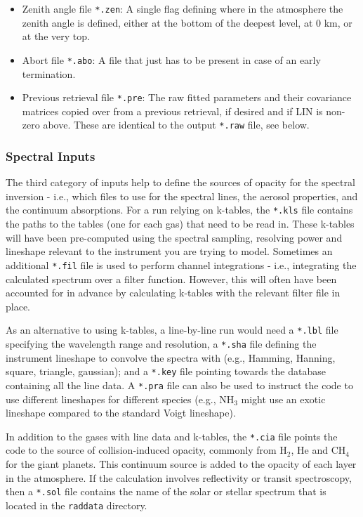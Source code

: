 \documentclass[final,5p,times,twocolumn,authoryear]{elsarticle}
\begin{document}
\begin{itemize}
\item Zenith angle file \verb#*.zen#:  A single flag defining where in the atmosphere the zenith angle is defined, either at the bottom of the deepest level, at 0 km, or at the very top.
\item Abort file \verb#*.abo#:  A file that just has to be present in case of an early termination.
\item Previous retrieval file \verb#*.pre#:  The raw fitted parameters and their covariance matrices copied over from a previous retrieval, if desired and if LIN is non-zero above.  These are identical to the output \verb#*.raw# file, see below.
\end{itemize}

\subsubsection{Spectral Inputs}

The third category of inputs help to define the sources of opacity for the spectral inversion - i.e., which files to use for the spectral lines, the aerosol properties, and the continuum absorptions.  For a run relying on k-tables, the \verb#*.kls# file contains the paths to the tables (one for each gas) that need to be read in.  These k-tables will have been pre-computed using the spectral sampling, resolving power and lineshape relevant to the instrument you are trying to model.  Sometimes an additional \verb#*.fil# file is used to perform channel integrations - i.e., integrating the calculated spectrum over a filter function.  However, this will often have been accounted for in advance by calculating k-tables with the relevant filter file in place. 

As an alternative to using k-tables, a line-by-line run would need a \verb#*.lbl# file specifying the wavelength range and resolution, a \verb#*.sha# file defining the instrument lineshape to convolve the spectra with (e.g., Hamming, Hanning, square, triangle, gaussian); and a \verb#*.key# file pointing towards the database containing all the line data.  A \verb#*.pra# file can also be used to instruct the code to use different lineshapes for different species (e.g., NH$_3$ might use an exotic lineshape compared to the standard Voigt lineshape).

In addition to the gases with line data and k-tables, the \verb#*.cia# file points the code to the source of collision-induced opacity, commonly from H$_2$, He and CH$_4$ for the giant planets.  This continuum source is added to the opacity of each layer in the atmosphere.  If the calculation involves reflectivity or transit spectroscopy, then a \verb#*.sol# file contains the name of the solar or stellar spectrum that is located in the \verb#raddata# directory.
\end{document}
